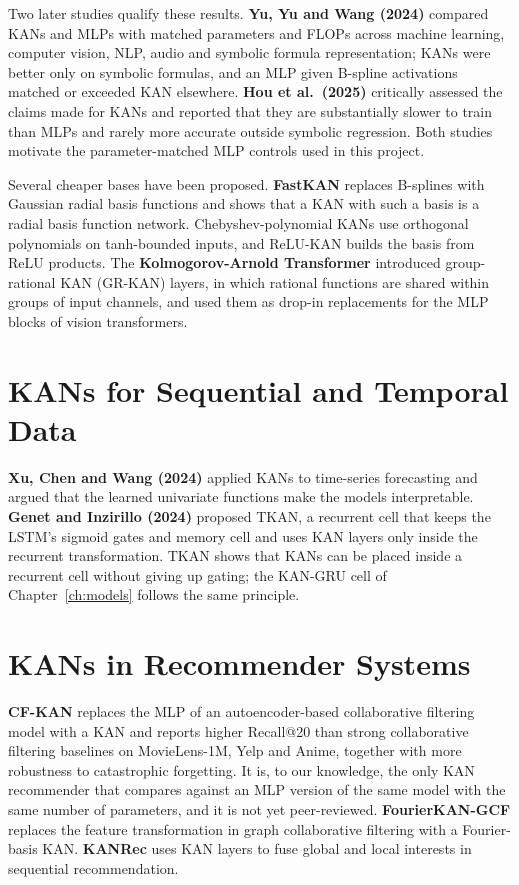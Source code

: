 \documentclass[12pt,a4paper]{report}
\begin{document}
Two later studies qualify these results. \textbf{Yu, Yu and Wang (2024)}
\cite{yu2024} compared KANs and MLPs with matched parameters and FLOPs across
machine learning, computer vision, NLP, audio and symbolic formula
representation; KANs were better only on symbolic formulas, and an MLP given
B-spline activations matched or exceeded KAN elsewhere.
\textbf{Hou et al.\ (2025)} \cite{hou2025} critically assessed the claims made
for KANs and reported that they are substantially slower to train than MLPs and
rarely more accurate outside symbolic regression. Both studies motivate the
parameter-matched MLP controls used in this project.

Several cheaper bases have been proposed. \textbf{FastKAN} \cite{li2024fastkan}
replaces B-splines with Gaussian radial basis functions and shows that a KAN
with such a basis is a radial basis function network. Chebyshev-polynomial KANs
\cite{ss2024cheby} use orthogonal polynomials on tanh-bounded inputs, and
ReLU-KAN \cite{relukan} builds the basis from ReLU products. The
\textbf{Kolmogorov-Arnold Transformer} \cite{yang2025kat} introduced group-rational
KAN (GR-KAN) layers, in which rational functions are shared within groups of
input channels, and used them as drop-in replacements for the MLP blocks of
vision transformers.

\section{KANs for Sequential and Temporal Data}

\textbf{Xu, Chen and Wang (2024)} \cite{xu2024tskan} applied KANs to time-series
forecasting and argued that the learned univariate functions make the models
interpretable. \textbf{Genet and Inzirillo (2024)} \cite{genet2024} proposed TKAN,
a recurrent cell that keeps the LSTM's sigmoid gates and memory cell and uses KAN
layers only inside the recurrent transformation. TKAN shows that KANs can be
placed inside a recurrent cell without giving up gating; the KAN-GRU cell of
Chapter~\ref{ch:models} follows the same principle.

\section{KANs in Recommender Systems}

\textbf{CF-KAN} \cite{park2024cfkan} replaces the MLP of an autoencoder-based
collaborative filtering model with a KAN and reports higher Recall@20 than strong
collaborative filtering baselines on MovieLens-1M, Yelp and Anime, together with
more robustness to catastrophic forgetting. It is, to our knowledge, the only KAN
recommender that compares against an MLP version of the same model with the same
number of parameters, and it is not yet peer-reviewed. \textbf{FourierKAN-GCF}
\cite{xu2024fkgcf} replaces the feature transformation in graph collaborative
filtering with a Fourier-basis KAN. \textbf{KANRec} \cite{xu2026kanrec} uses KAN
layers to fuse global and local interests in sequential recommendation.
\end{document}

